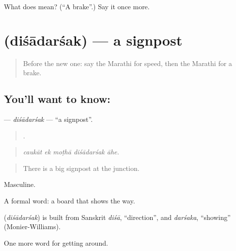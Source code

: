\begin{tcolorbox}[breakable,colback=teal!4,colframe=teal!35!black,title={Before you move on}]
What does  mean? (\textquotedblleft{}A brake\textquotedblright{}.) Say it once more.
\end{tcolorbox}
\section[\texorpdfstring{\mr{दिशादर्शक} (diśādarśak)}{दिशादर्शक (diśādarśak)}]{ (diśādarśak) — a signpost}

\label{lesson:MR-C407-disadarsak}



\begin{quote}
Before the new one: say the Marathi for speed, then the Marathi for a brake.
\end{quote}

\subsection*{You'll want to know: }
\textbf{} — \emph{diśādarśak} — \textquotedblleft{}a signpost\textquotedblright{}.

\begin{quote}
    .
\end{quote}

\begin{quote}
\emph{caukāt ek moṭhā diśādarśak āhe.}
\end{quote}

\begin{quote}
There is a big signpost at the junction.
\end{quote}

Masculine.

A formal word: a board that shows the way.

\begin{cousinweb}
\textbf{} (\emph{diśādarśak}) is built from Sanskrit \emph{diśā}, \textquotedblleft{}direction\textquotedblright{}, and \emph{darśaka}, \textquotedblleft{}showing\textquotedblright{} (Monier-Williams).
\end{cousinweb}

\begin{grammarlens}[title={What you've built}]
One more word for getting around.
\end{grammarlens}

